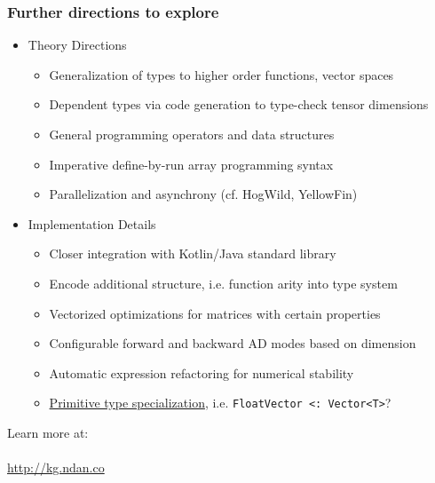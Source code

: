 \documentclass{beamer}
\begin{document}
    \begin{frame}
        \frametitle{Further directions to explore}
        \begin{itemize}
            \item Theory Directions
            \begin{itemize}
                \item Generalization of types to higher order functions, vector spaces
                \item Dependent types via code generation to type-check tensor dimensions
                \item General programming operators and data structures
                \item Imperative define-by-run array programming syntax
                \item Parallelization and asynchrony (cf. HogWild, YellowFin)
            \end{itemize}
            \item Implementation Details
            \begin{itemize}
                \item Closer integration with Kotlin/Java standard library
                \item Encode additional structure, i.e. function arity into type system
                \item Vectorized optimizations for matrices with certain properties
                \item Configurable forward and backward AD modes based on dimension
                \item Automatic expression refactoring for numerical stability
                \item \href{https://discuss.kotlinlang.org/t/primitive-type-specialization/11022}{Primitive type specialization}, i.e. \texttt{FloatVector <: Vector<T>}?
            \end{itemize}
        \end{itemize}
    \end{frame}

    \begin{frame}
        \begin{center}
            \Huge{Learn more at: \\~\\
            \url{http://kg.ndan.co}}
        \end{center}
    \end{frame}
\end{document}
